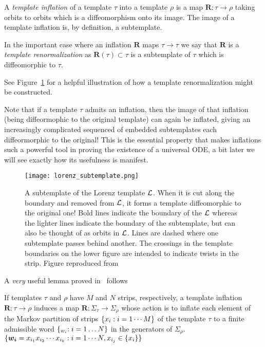\documentclass[paper.tex]{subfiles}
\begin{document}
\begin{definition}
  A  \emph{template inflation} of a template $\tau$ into a template $\rho$ is a map $\bm{R} : \tau \to \rho$ taking orbits to orbits which is a diffeomorphism onto its image.
  The image of a template inflation is, by definition, a subtemplate.
\end{definition}


\begin{definition}
  In the important case where an inflation $\bm{R}$ maps $\tau \to \tau$ we say that $\bm{R}$ is a \emph{template renormalization} as $\bm{R}(\tau) \subset \tau$ is a subtemplate of $\tau$ which
  is diffeomorphic to $\tau$.
\end{definition}


See Figure~\ref{fig:lorenz_subtemplate} for a helpful illustration of how a template renormalization might be constructed.


Note that if a template $\tau$ admits an inflation, then the image of that inflation (being diffeormophic to the original template) can again be inflated, giving an increasingly complicated sequenced of embedded
subtemplates each diffeormorphic to the original! This is the essential property that makes inflations such a powerful tool in proving the existence of a universal ODE, a bit later
we will see exactly how its usefulness is manifest.

\begin{figure}[h]
  \centering
  \texttt{[image: lorenz\_subtemplate.png]}
  \caption{A subtemplate of the Lorenz template $\mathcal{L}$. When it is cut along the boundary and removed from $\mathcal{L}$, it forms a template diffeomorphic to the original one!
    Bold lines indicate the boundary of the $\mathcal{L}$ whereas the lighter lines indicate the boundary of the subtemplate, but can also be thought of as orbits in $\mathcal{L}$.
    Lines are dashed where one subtemplate passes behind another. The crossings in the template boundaries on the lower figure
    are intended to indicate twists in the strip.
    Figure reproduced from~\cite{knottyode}}\label{fig:lorenz_subtemplate}
\end{figure}

A \emph{very} useful lemma proved in~\cite{knottyode} follows


\begin{lemma}
  If templates $\tau$ and $\rho$ have $M$ and $N$ strips, respectively, a template inflation $\bm{R}: \tau \to \rho$ induces a map $\bm{R}: \Sigma_\tau \to \Sigma_\rho$ whose action is to inflate each element of the Markov partition of strips $\{ x_i : i = 1\cdots M \}$ of the template $\tau$ to a finite
  admissible word $\{ \bm_{w_i}: i = 1 \dots N \}$ in the generators of $\Sigma_\rho$.  $\{ \bm{w_i} = x_{i_1} x_{i_2} \cdots x_{i_k} : i = 1 \cdots N, x_{i_j} \in \{ x_i \} \}$\label{lemma:symbolic}
\end{lemma}
\end{document}
